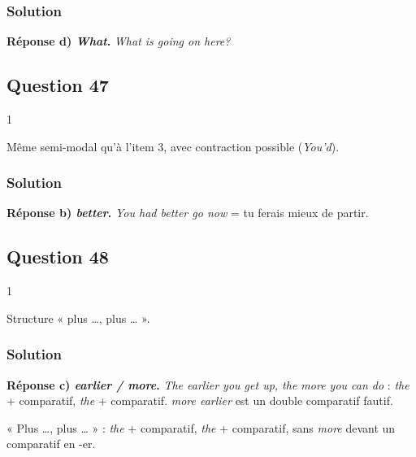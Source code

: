 \documentclass[11pt,a4paper]{article}
\begin{document}
\hypertarget{solution-45}{%
\subsubsection{Solution}\label{solution-45}}

\textbf{Réponse d) \emph{What}.} \emph{What is going on here?}

\hypertarget{question-47}{%
\subsection{Question 47}\label{question-47}}

\begin{indication}{1}

Même semi-modal qu'à l'item 3, avec contraction possible (\emph{You'd}).

\end{indication}

\hypertarget{solution-46}{%
\subsubsection{Solution}\label{solution-46}}

\textbf{Réponse b) \emph{better}.} \emph{You had better go now} = tu ferais mieux de partir.

\hypertarget{question-48}{%
\subsection{Question 48}\label{question-48}}

\begin{indication}{1}

Structure « plus \ldots, plus \ldots{} ».

\end{indication}

\hypertarget{solution-47}{%
\subsubsection{Solution}\label{solution-47}}

\textbf{Réponse c) \emph{earlier / more}.} \emph{The earlier you get up, the more you can do} : \emph{the} + comparatif, \emph{the} + comparatif. \emph{more earlier} est un double comparatif fautif.

\begin{methode}

« Plus \ldots, plus \ldots{} » : \emph{the} + comparatif, \emph{the} + comparatif, sans \emph{more} devant un comparatif en -er.

\end{methode}
\end{document}
